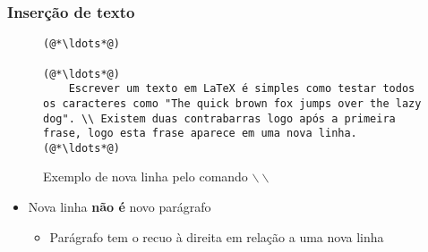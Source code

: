 \begin{frame}[fragile] \frametitle{Inserção de texto}
\begin{figure}[!t]
\caption{Exemplo de nova linha pelo comando $\backslash\backslash$}
\begin{lstlisting}
(@*\ldots*@)

(@*\ldots*@)
	Escrever um texto em LaTeX é simples como testar todos os caracteres como "The quick brown fox jumps over the lazy dog". \\ Existem duas contrabarras logo após a primeira frase, logo esta frase aparece em uma nova linha.
(@*\ldots*@)

\end{lstlisting}
\ownsrc
\end{figure}

\begin{itemize}
	\item Nova linha \textbf{não é} novo parágrafo
	\begin{itemize}
		\item Parágrafo tem o recuo à direita em relação a uma nova linha
	\end{itemize}
\end{itemize}
\end{frame}

	